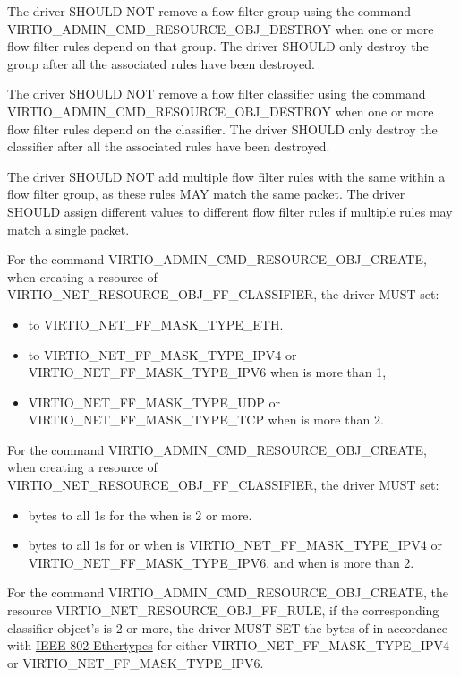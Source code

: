 The driver SHOULD NOT remove a flow filter group using the command
VIRTIO_ADMIN_CMD_RESOURCE_OBJ_DESTROY when one or more flow filter rules
depend on that group. The driver SHOULD only destroy the group after
all the associated rules have been destroyed.

The driver SHOULD NOT remove a flow filter classifier using the command
VIRTIO_ADMIN_CMD_RESOURCE_OBJ_DESTROY when one or more flow filter rules
depend on the classifier. The driver SHOULD only destroy the classifier
after all the associated rules have been destroyed.

The driver SHOULD NOT add multiple flow filter rules with the same
 within a flow filter group, as these rules MAY match
the same packet. The driver SHOULD assign different 
values to different flow filter rules if multiple rules may match a single
packet.

For the command VIRTIO_ADMIN_CMD_RESOURCE_OBJ_CREATE, when creating a resource
of  VIRTIO_NET_RESOURCE_OBJ_FF_CLASSIFIER, the driver MUST set:
\begin{itemize}
\item {} to VIRTIO_NET_FF_MASK_TYPE_ETH.
\item {} to VIRTIO_NET_FF_MASK_TYPE_IPV4 or
      VIRTIO_NET_FF_MASK_TYPE_IPV6 when  is more than 1,
\item {} VIRTIO_NET_FF_MASK_TYPE_UDP or
      VIRTIO_NET_FF_MASK_TYPE_TCP when  is more than 2.
\end{itemize}

For the command VIRTIO_ADMIN_CMD_RESOURCE_OBJ_CREATE, when creating a resource
of  VIRTIO_NET_RESOURCE_OBJ_FF_CLASSIFIER, the driver MUST set:
\begin{itemize}
\item {} bytes to all 1s for the 
       when  is 2 or more.
\item {} bytes to all 1s for  or 
       when  is VIRTIO_NET_FF_MASK_TYPE_IPV4 or VIRTIO_NET_FF_MASK_TYPE_IPV6,
       and when  is more than 2.
\end{itemize}

For the command VIRTIO_ADMIN_CMD_RESOURCE_OBJ_CREATE, the resource 
VIRTIO_NET_RESOURCE_OBJ_FF_RULE, if the corresponding classifier object's
 is 2 or more, the driver MUST SET the  bytes of
 in accordance with
\hyperref[intro:IEEE 802 Ethertypes]{IEEE 802 Ethertypes}
for either VIRTIO_NET_FF_MASK_TYPE_IPV4 or VIRTIO_NET_FF_MASK_TYPE_IPV6.

